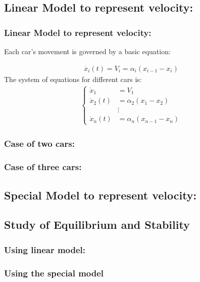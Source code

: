 \documentclass{beamer}
\begin{document}
\begin{frame}
\subsection{Linear Model to represent velocity:}
\frametitle{Linear Model to represent velocity:}
Each car's movement is governed by a basic equation:
			
			\begin{align*}
				\dot{x_i}(t) = V_i = \alpha_i(x_{i-1} - x_i)
			\end{align*}
\newline
The system of equations for different cars is: 
    \begin{align*}
				\left\{
				\begin{array}{ll}
					\dot{x}_1 &= V_1 \\
					\dot{x}_2(t) &= \alpha_2(x_1 - x_2) \\
					&\vdots \\
					\dot{x}_n(t) &= \alpha_n(x_{n-1} - x_n)
				\end{array}
				\right.
			\end{align*}
\end{frame}
\subsubsection{Case of two cars:}  
\begin{frame}
\end{frame}
\subsubsection{Case of three cars:}  

\subsection{Special Model to represent velocity:}
\subsection{Study of Equilibrium and Stability}
\subsubsection{Using linear model:}
\subsubsection{Using the special model}
\end{document}
